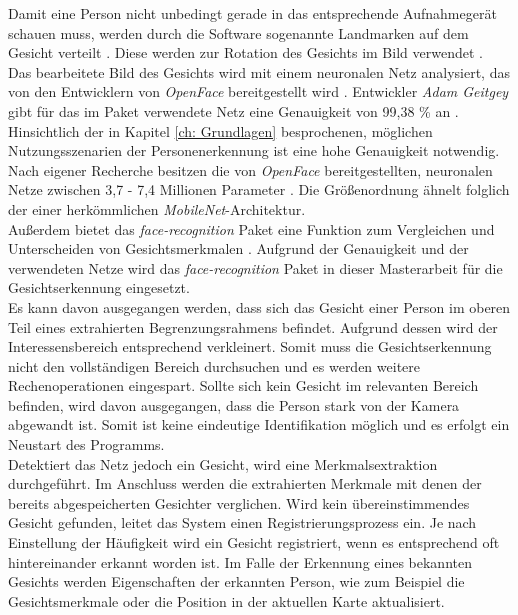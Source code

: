 	Damit eine Person nicht unbedingt gerade in das entsprechende Aufnahmegerät schauen muss, werden durch die Software sogenannte Landmarken auf dem Gesicht verteilt \cite{facerecarticle}. Diese werden zur Rotation des Gesichts im Bild verwendet \cite{facerecarticle}. \\
	
	Das bearbeitete Bild des Gesichts wird mit einem neuronalen Netz analysiert, das von den Entwicklern von \textit{OpenFace} bereitgestellt wird \cite{facerecarticle}. Entwickler \textit{Adam Geitgey} gibt für das im Paket verwendete Netz eine Genauigkeit von 99,38 \% an \cite{facerecognition}. Hinsichtlich der in Kapitel \ref{ch: Grundlagen} besprochenen, möglichen Nutzungsszenarien der Personenerkennung ist eine hohe Genauigkeit notwendig. \\
	
	Nach eigener Recherche besitzen die von \textit{OpenFace} bereitgestellten, neuronalen Netze zwischen 3,7 - 7,4 Millionen Parameter \cite{openface}. Die Größenordnung ähnelt folglich der einer herkömmlichen \textit{MobileNet}-Architektur.\\
	
	Außerdem bietet das \textit{face-recognition} Paket eine Funktion zum Vergleichen und Unterscheiden von Gesichtsmerkmalen \cite{facerecarticle}. Aufgrund der Genauigkeit und der verwendeten Netze wird das \textit{face-recognition} Paket in dieser Masterarbeit für die Gesichtserkennung eingesetzt.\\
	
	Es kann davon ausgegangen werden, dass sich das Gesicht einer Person im oberen Teil eines extrahierten Begrenzungsrahmens befindet. Aufgrund dessen wird der Interessensbereich entsprechend verkleinert. Somit muss die Gesichtserkennung nicht den vollständigen Bereich durchsuchen und es werden weitere Rechenoperationen eingespart. Sollte sich kein Gesicht im relevanten Bereich befinden, wird davon ausgegangen, dass die Person stark von der Kamera abgewandt ist. Somit ist keine eindeutige Identifikation möglich und es erfolgt ein Neustart des Programms.\\
	
	Detektiert das Netz jedoch ein Gesicht, wird eine Merkmalsextraktion durchgeführt. Im Anschluss werden die extrahierten Merkmale mit denen der bereits abgespeicherten Gesichter verglichen. Wird kein übereinstimmendes Gesicht gefunden, leitet das System einen Registrierungsprozess ein. Je nach Einstellung der Häufigkeit wird ein Gesicht registriert, wenn es entsprechend oft hintereinander erkannt worden ist. Im Falle der Erkennung eines bekannten Gesichts werden Eigenschaften der erkannten Person, wie zum Beispiel die Gesichtsmerkmale oder die Position in der aktuellen Karte aktualisiert. \\ 
	
